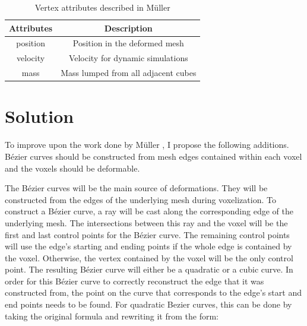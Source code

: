 \begin{table}
  \begin{center}
    \begin{tabular}{|c | c|} 
      \hline
      Attributes & Description \\ [0.5ex] 
      \hline\hline
      position & Position in the deformed mesh  \\ 
      \hline
      velocity & Velocity for dynamic simulations  \\
      \hline
      mass & Mass lumped from all adjacent cubes\\
      \hline
    \end{tabular}
  \end{center}
  
  \caption{Vertex attributes described in Müller \etal}\label{tab:VertexAttributes}
\end{table}

\section{Solution}
To improve upon the work done by Müller \etal, I propose the following additions. Bézier curves 
should be constructed from mesh edges contained within each voxel and the voxels should be 
deformable.

The Bézier curves will be the main source of deformations. They will be constructed from the edges
of the underlying mesh during voxelization. To construct a Bézier curve, a ray will be cast along 
the corresponding edge of the underlying mesh. The intersections between this ray and the voxel will
be the first and last control points for the Bézier curve. The remaining control points will use the
edge's starting and ending points if the whole edge is contained by the voxel. Otherwise, the vertex
contained by the voxel will be the only control point. The resulting Bézier curve will either be a
quadratic or a cubic curve. In order for this Bézier curve to correctly reconstruct the edge that it
was constructed from, the point on the curve that corresponds to the edge's start and end points 
needs to be found. For quadratic Bezier curves, this can be done by taking the original formula and
rewriting it from the form:

